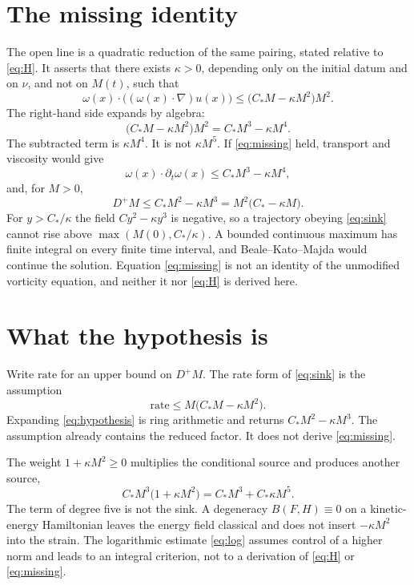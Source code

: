 \documentclass[11pt]{article}
\theoremstyle{definition}
\theoremstyle{remark}
\begin{document}
\section{The missing identity}
The open line is a quadratic reduction of the same pairing, stated relative to \eqref{eq:H}. It asserts that there exists $\kappa>0$, depending only on the initial datum and on $\nu$, and not on $M(t)$, such that
\begin{equation}
\label{eq:missing}
\omega(x)\cdot\bigl((\omega(x)\cdot\nabla)u(x)\bigr)
\le\bigl(C_* M-\kappa M^2\bigr)M^2.
\end{equation}
The right-hand side expands by algebra:
\begin{equation}
\label{eq:expand}
\bigl(C_* M-\kappa M^2\bigr)M^2=C_* M^3-\kappa M^4.
\end{equation}
The subtracted term is $\kappa M^4$. It is not $\kappa M^5$. If \eqref{eq:missing} held, transport and viscosity would give
\[
\omega(x)\cdot\partial_t\omega(x)\le C_* M^3-\kappa M^4,
\]
and, for $M>0$,
\begin{equation}
\label{eq:sink}
D^+M\le C_* M^2-\kappa M^3=M^2\bigl(C_*-\kappa M\bigr).
\end{equation}
For $y>C_*/\kappa$ the field $C y^2-\kappa y^3$ is negative, so a trajectory obeying \eqref{eq:sink} cannot rise above $\max(M(0),C_*/\kappa)$. A bounded continuous maximum has finite integral on every finite time interval, and Beale--Kato--Majda would continue the solution. Equation \eqref{eq:missing} is not an identity of the unmodified vorticity equation, and neither it nor \eqref{eq:H} is derived here.

\section{What the hypothesis is}
Write $\mathrm{rate}$ for an upper bound on $D^+M$. The rate form of \eqref{eq:sink} is the assumption
\begin{equation}
\label{eq:hypothesis}
\mathrm{rate}\le M\bigl(C_* M-\kappa M^2\bigr).
\end{equation}
Expanding \eqref{eq:hypothesis} is ring arithmetic and returns $C_* M^2-\kappa M^3$. The assumption already contains the reduced factor. It does not derive \eqref{eq:missing}.

The weight $1+\kappa M^2\ge 0$ multiplies the conditional source and produces another source,
\[
C_* M^3\bigl(1+\kappa M^2\bigr)=C_* M^3+C_*\kappa M^5.
\]
The term of degree five is not the sink. A degeneracy $B(F,H)\equiv 0$ on a kinetic-energy Hamiltonian leaves the energy field classical and does not insert $-\kappa M^2$ into the strain. The logarithmic estimate \eqref{eq:log} assumes control of a higher norm and leads to an integral criterion, not to a derivation of \eqref{eq:H} or \eqref{eq:missing}.
\end{document}
